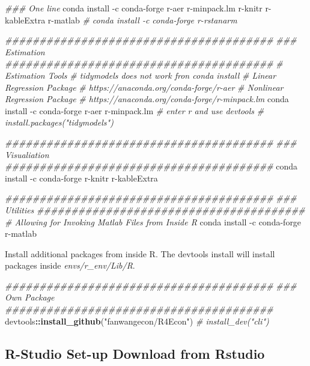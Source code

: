 \documentclass[
]{article}
\newenvironment{Shaded}{\begin{snugshade}}{\end{snugshade}}
\newcommand{\CommentTok}[1]{\textcolor[rgb]{0.56,0.35,0.01}{\textit{#1}}}
\newcommand{\ExtensionTok}[1]{#1}
\newcommand{\KeywordTok}[1]{\textcolor[rgb]{0.13,0.29,0.53}{\textbf{#1}}}
\newcommand{\NormalTok}[1]{#1}
\newcommand{\OperatorTok}[1]{\textcolor[rgb]{0.81,0.36,0.00}{\textbf{#1}}}
\newcommand{\StringTok}[1]{\textcolor[rgb]{0.31,0.60,0.02}{#1}}
\begin{document}
\begin{Shaded}
\begin{Highlighting}[]
\CommentTok{### One line}
\ExtensionTok{conda}\NormalTok{ install -c conda-forge r-aer r-minpack.lm r-knitr r-kableExtra r-matlab}
\CommentTok{# conda install -c conda-forge r-rstanarm}

\CommentTok{#######################################}
\CommentTok{### Estimation}
\CommentTok{#######################################}
\CommentTok{# Estimation Tools}
\CommentTok{# tidymodels does not work fron conda install}
\CommentTok{# Linear Regression Package}
\CommentTok{# https://anaconda.org/conda-forge/r-aer}
\CommentTok{# Nonlinear Regression Package}
\CommentTok{# https://anaconda.org/conda-forge/r-minpack.lm}
\ExtensionTok{conda}\NormalTok{ install -c conda-forge r-aer r-minpack.lm}
\CommentTok{# enter r and use devtools}
\CommentTok{# install.packages("tidymodels")}

\CommentTok{#######################################}
\CommentTok{### Visualiation}
\CommentTok{#######################################}
\ExtensionTok{conda}\NormalTok{ install -c conda-forge r-knitr r-kableExtra}

\CommentTok{#######################################}
\CommentTok{### Utilities}
\CommentTok{#######################################}
\CommentTok{# Allowing for Invoking Matlab Files from Inside R}
\ExtensionTok{conda}\NormalTok{ install -c conda-forge r-matlab}
\end{Highlighting}
\end{Shaded}

Install additional packages from inside R. The devtools install will
install packages inside \emph{envs/r\_env/Lib/R}.

\begin{Shaded}
\begin{Highlighting}[]
\CommentTok{#######################################}
\CommentTok{### Own Package}
\CommentTok{#######################################}
\NormalTok{devtools}\OperatorTok{::}\KeywordTok{install_github}\NormalTok{(}\StringTok{"fanwangecon/R4Econ"}\NormalTok{)}
\CommentTok{# install_dev("cli")}
\end{Highlighting}
\end{Shaded}

\hypertarget{r-studio-set-up-download-from-rstudio}{%
\subsection{R-Studio Set-up Download from
Rstudio}\label{r-studio-set-up-download-from-rstudio}}
\end{document}
